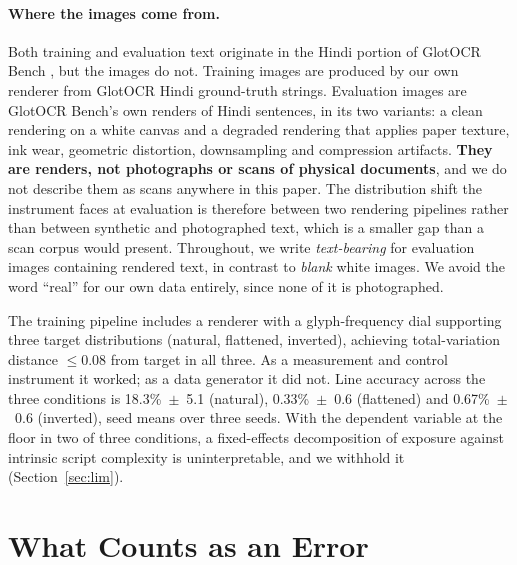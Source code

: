 \documentclass{article}
\begin{document}
\paragraph{Where the images come from.} Both training and evaluation text originate in the
Hindi portion of GlotOCR Bench \citep{kargaran2026glotocr}, but the images do not. Training
images are produced by our own renderer from GlotOCR Hindi ground-truth strings. Evaluation
images are GlotOCR Bench's own renders of Hindi sentences, in its two variants: a clean
rendering on a white canvas and a degraded rendering that applies paper texture, ink wear,
geometric distortion, downsampling and compression artifacts. \textbf{They are renders, not
photographs or scans of physical documents}, and we do not describe them as scans anywhere in
this paper. The distribution shift the instrument faces at evaluation is therefore between two
rendering pipelines rather than between synthetic and photographed text, which is a smaller gap
than a scan corpus would present. Throughout, we write \emph{text-bearing} for evaluation images containing rendered text, in
contrast to \emph{blank} white images. We avoid the word ``real'' for our own data entirely,
since none of it is photographed.

The training pipeline includes a renderer with a glyph-frequency dial supporting three target
distributions (natural, flattened, inverted), achieving total-variation distance $\leq 0.08$
from target in all three. As a measurement and control instrument it worked; as a data
generator it did not. Line accuracy across the three conditions is 18.3\%~$\pm$~5.1 (natural),
0.33\%~$\pm$~0.6 (flattened) and 0.67\%~$\pm$~0.6 (inverted), seed means over three seeds.
With the dependent variable at the floor in two of three conditions, a fixed-effects
decomposition of exposure against intrinsic script complexity is uninterpretable, and we
withhold it (Section~\ref{sec:lim}).

\section{What Counts as an Error}
\label{sec:scoring}
\end{document}

